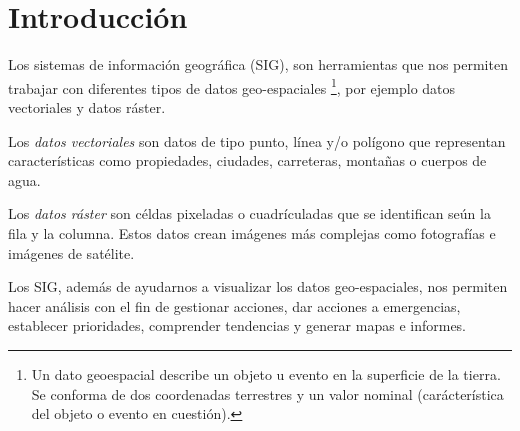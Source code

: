
\section{Introducción}

Los sistemas de información geográfica (SIG), son herramientas que nos permiten
trabajar con diferentes tipos de datos geo-espaciales \footnote{Un dato
geoespacial describe un objeto u evento en la superficie de la tierra. Se
conforma de dos coordenadas terrestres y un valor nominal (carácterística del
objeto o evento en cuestión).}, por ejemplo datos vectoriales y datos ráster.

Los \textit{datos vectoriales} son datos de tipo punto, línea y/o polígono que
representan características como propiedades, ciudades, carreteras, montañas o
cuerpos de agua.

Los \textit{datos ráster} son céldas pixeladas o cuadrículadas que se
identifican seún la fila y la columna. Estos datos crean imágenes más complejas
como fotografías e imágenes de satélite.

Los SIG, además de ayudarnos a visualizar los datos geo-espaciales, nos permiten
hacer análisis con el fin de gestionar acciones, dar acciones a emergencias,
establecer prioridades, comprender tendencias y generar mapas e informes.
